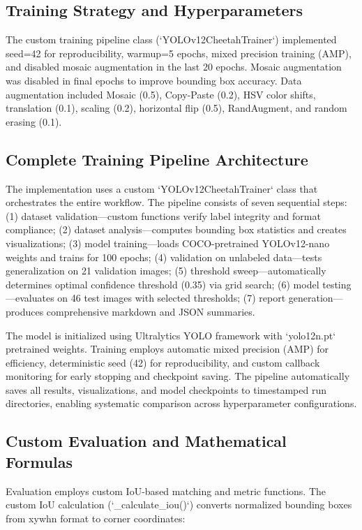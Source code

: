 \documentclass[conference]{IEEEtran}
\begin{document}
\subsection{Training Strategy and Hyperparameters}

The custom training pipeline class (`YOLOv12CheetahTrainer`) implemented seed=42 for reproducibility, warmup=5 epochs, mixed precision training (AMP), and disabled mosaic augmentation in the last 20 epochs. Mosaic augmentation was disabled in final epochs to improve bounding box accuracy. Data augmentation included Mosaic (0.5), Copy-Paste (0.2), HSV color shifts, translation (0.1), scaling (0.2), horizontal flip (0.5), RandAugment, and random erasing (0.1).

\subsection{Complete Training Pipeline Architecture}

The implementation uses a custom `YOLOv12CheetahTrainer` class that orchestrates the entire workflow. The pipeline consists of seven sequential steps: (1) dataset validation—custom functions verify label integrity and format compliance; (2) dataset analysis—computes bounding box statistics and creates visualizations; (3) model training—loads COCO-pretrained YOLOv12-nano weights and trains for 100 epochs; (4) validation on unlabeled data—tests generalization on 21 validation images; (5) threshold sweep—automatically determines optimal confidence threshold (0.35) via grid search; (6) model testing—evaluates on 46 test images with selected thresholds; (7) report generation—produces comprehensive markdown and JSON summaries.

The model is initialized using Ultralytics YOLO framework with `yolo12n.pt` pretrained weights. Training employs automatic mixed precision (AMP) for efficiency, deterministic seed (42) for reproducibility, and custom callback monitoring for early stopping and checkpoint saving. The pipeline automatically saves all results, visualizations, and model checkpoints to timestamped run directories, enabling systematic comparison across hyperparameter configurations.

\subsection{Custom Evaluation and Mathematical Formulas}

Evaluation employs custom IoU-based matching and metric functions. The custom IoU calculation (`\_calculate\_iou()`) converts normalized bounding boxes from xywhn format to corner coordinates:
\end{document}

